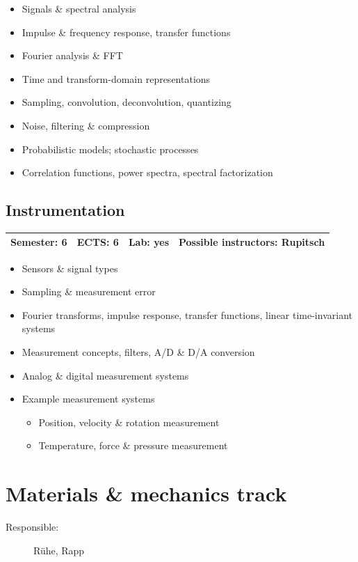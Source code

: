 \documentclass[12pt,twoside,fleqn,a4paper]{article}
\begin{document}
\begin{itemize}
\setlength\itemsep{0cm}
\item Signals \& spectral analysis
\item Impulse \& frequency response, transfer functions
\item Fourier analysis \& FFT
\item Time and transform-domain representations
\item Sampling, convolution, deconvolution, quantizing
\item Noise, filtering \& compression
\item Probabilistic models; stochastic processes
\item Correlation functions, power spectra, spectral factorization
\end{itemize}


\subsection{Instrumentation}
\begin{tabular}{llll} \hline
\textbf{Semester:} 6 & \textbf{ECTS:} 6 & \textbf{Lab:} yes & \textbf{Possible instructors:} Rupitsch\\
\hline
\end{tabular}

\begin{itemize}
\setlength\itemsep{0cm}
\item Sensors \& signal types
\item Sampling \& measurement error
\item Fourier transforms, impulse response, transfer functions, linear time-invariant systems
\item Measurement concepts, filters, A/D \& D/A conversion
\item Analog \& digital measurement systems
\item Example measurement systems
\begin{itemize}
\item Position, velocity \& rotation measurement
\item Temperature, force \& pressure measurement
\end{itemize}
\end{itemize}


\newpage
\section{Materials \& mechanics track}
\begin{description}
\item[Responsible:] Rühe, Rapp
\end{description}
\vspace{1 mm}
\end{document}
